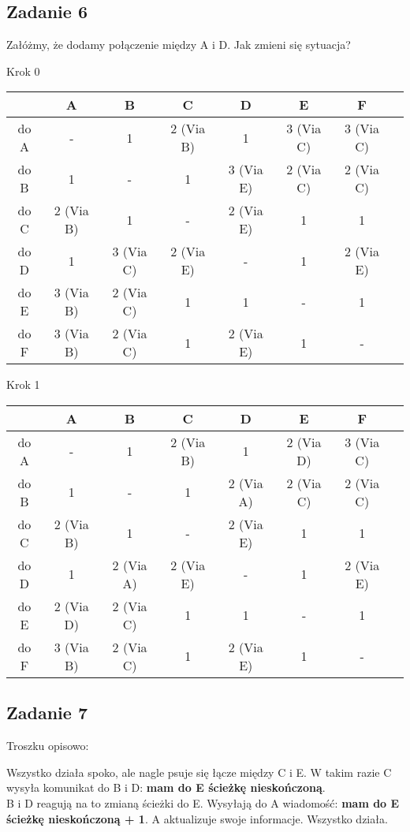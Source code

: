 \documentclass[a4paper]{article}
\begin{document}
\clearpage
\subsection*{Zadanie 6}
Załóżmy, że dodamy połączenie między A i D. Jak zmieni się sytuacja?

Krok 0\\
\begin{tabular}{|c *{6}{|c} |c|}\hline
 & A & B & C & D & E & F\\
\hline 
do A & - & 1 & 2 (Via B) & 1  & 3 (Via C) &  3 (Via C)\\
\hline 
do B & 1 & - & 1 & 3 (Via E) & 2 (Via C) & 2 (Via C)\\
\hline 
do C & 2 (Via B) & 1 & - & 2 (Via E) & 1 & 1\\
\hline 
do D & 1 & 3 (Via C) & 2 (Via E) & - & 1 & 2 (Via E)\\
\hline 
do E & 3 (Via B) & 2 (Via C) & 1 & 1 & - & 1\\
\hline
do F & 3 (Via B) & 2 (Via C) & 1 & 2 (Via E) & 1 & -\\
\hline
\end{tabular}

Krok 1\\
\begin{tabular}{|c *{6}{|c} |c|}\hline
 & A & B & C & D & E & F\\
\hline 
do A & - & 1 & 2 (Via B) & 1 & 2 (Via D) &  3 (Via C)\\
\hline 
do B & 1 & - & 1 & 2 (Via A) & 2 (Via C) & 2 (Via C)\\
\hline 
do C & 2 (Via B) & 1 & - & 2 (Via E) & 1 & 1\\
\hline 
do D & 1 & 2 (Via A) & 2 (Via E) & - & 1 & 2 (Via E)\\
\hline 
do E & 2 (Via D) & 2 (Via C) & 1 & 1 & - & 1\\
\hline
do F & 3 (Via B) & 2 (Via C) & 1 & 2 (Via E) & 1 & -\\
\hline
\end{tabular}

\subsection*{Zadanie 7}
Troszku opisowo:

Wszystko działa spoko, ale nagle psuje się łącze między C i E. W takim razie C wysyła komunikat do B i D: \textbf{mam do E ścieżkę nieskończoną}.\\
B i D reagują na to zmianą ścieżki do E. Wysyłają do A wiadomość: \textbf{mam do E ścieżkę nieskończoną + 1}. A aktualizuje swoje informacje. Wszystko działa.
\end{document}
